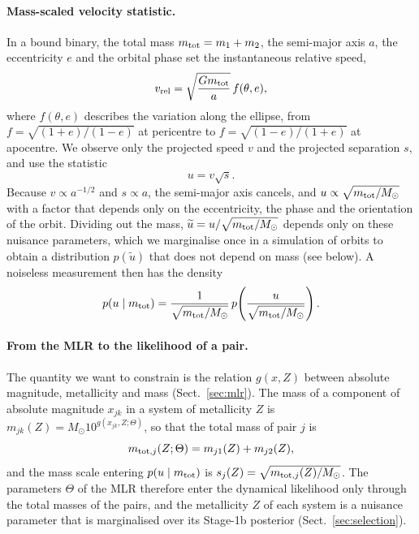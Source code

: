 \documentclass{aa}
\newcommand{\msun}{M_{\odot}}
\begin{document}
\paragraph{Mass-scaled velocity statistic.} In a bound binary, the total mass $m_{\rm tot}=m_1+m_2$, the semi-major axis $a$, the eccentricity $e$ and the orbital phase set the instantaneous relative speed,
\begin{equation}
 v_{\rm rel}=\sqrt{\frac{Gm_{\rm tot}}{a}}\,f(\theta,e),
\end{equation}
where $f(\theta,e)$ describes the variation along the ellipse, from $f=\sqrt{(1+e)/(1-e)}$ at pericentre to $f=\sqrt{(1-e)/(1+e)}$ at apocentre. We observe only the projected speed $v$ and the projected separation $s$, and use the statistic
\begin{equation}
 u=v\sqrt{s}.
 \label{eq:u}
\end{equation}
Because $v\propto a^{-1/2}$ and $s\propto a$, the semi-major axis cancels, and $u\propto\sqrt{m_{\rm tot}/\msun}$ with a factor that depends only on the eccentricity, the phase and the orientation of the orbit. Dividing out the mass, $\widetilde u=u/\sqrt{m_{\rm tot}/\msun}$ depends only on these nuisance parameters, which we marginalise once in a simulation of orbits to obtain a distribution $p(\widetilde u)$ that does not depend on mass (see below). A noiseless measurement then has the density
\begin{equation}
 p(u\mid m_{\rm tot})=\frac{1}{\sqrt{m_{\rm tot}/\msun}}\,p\!\left(\frac{u}{\sqrt{m_{\rm tot}/\msun}}\right).
\end{equation}

\paragraph{From the MLR to the likelihood of a pair.} The quantity we want to constrain is the relation $g(x,Z)$ between absolute magnitude, metallicity and mass (Sect.~\ref{sec:mlr}). The mass of a component of absolute magnitude $x_{jk}$ in a system of metallicity $Z$ is $m_{jk}(Z)=\msun10^{g(x_{jk},Z;\Theta)}$, so that the total mass of pair $j$ is
\begin{equation}
 m_{{\rm tot},j}(Z;\Theta)=m_{j1}(Z)+m_{j2}(Z),
\end{equation}
and the mass scale entering $p(u\mid m_{\rm tot})$ is $s_j(Z)=\sqrt{m_{{\rm tot},j}(Z)/\msun}$. The parameters $\Theta$ of the MLR therefore enter the dynamical likelihood only through the total masses of the pairs, and the metallicity $Z$ of each system is a nuisance parameter that is marginalised over its Stage-1b posterior (Sect.~\ref{sec:selection}).
\end{document}
